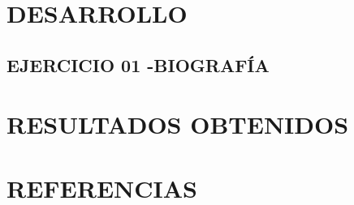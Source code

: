 \documentclass[10pt]{article}
\begin{document}

\newpage
\section{DESARROLLO}


\subsection{EJERCICIO 01 -BIOGRAFÍA}



\newpage
\section{RESULTADOS OBTENIDOS}


\newpage
\section{REFERENCIAS}
\end{document}
